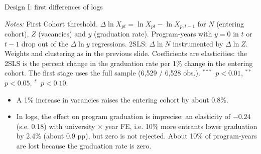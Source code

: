 \documentclass{beamer}
\newcommand{\sym}[1]{\ensuremath{^{#1}}}
\begin{document}
\begin{frame}{Design I: first differences of logs}
\centering
\scriptsize
\resizebox{0.55\linewidth}{!}{}

\vspace{0.1cm}
\parbox{0.97\textwidth}{\tiny
\textit{Notes:} First Cohort threshold. $\Delta\ln X_{pt}=\ln X_{pt}-\ln X_{p,t-1}$ for $N$ (entering cohort), $Z$ (vacancies) and $y$ (graduation rate). Program-years with $y=0$ in $t$ or $t-1$ drop out of the $\Delta\ln y$ regressions.
2SLS: $\Delta\ln N$ instrumented by $\Delta\ln Z$. Weights and clustering as in the previous slide. Coefficients are elasticities: the 2SLS is the percent change in the graduation rate per 1\% change in the entering cohort. The first stage uses the full sample (6,529 / 6,528 obs.).
\sym{***}~$p<0.01$, \sym{**}~$p<0.05$, \sym{*}~$p<0.10$.}

\vspace{0.1cm}
\begin{itemize}\scriptsize
    \setlength{\itemsep}{1pt}
    \item A 1\% increase in vacancies raises the entering cohort by about 0.8\%.
    \item In logs, the effect on program graduation is imprecise: an elasticity of $-0.24$ (s.e. 0.18) with university $\times$ year FE, i.e. 10\% more entrants lower graduation by 2.4\% (about 0.9 pp), but zero is not rejected. About 10\% of program-years are lost because the graduation rate is zero.
\end{itemize}
\end{frame}
\end{document}
